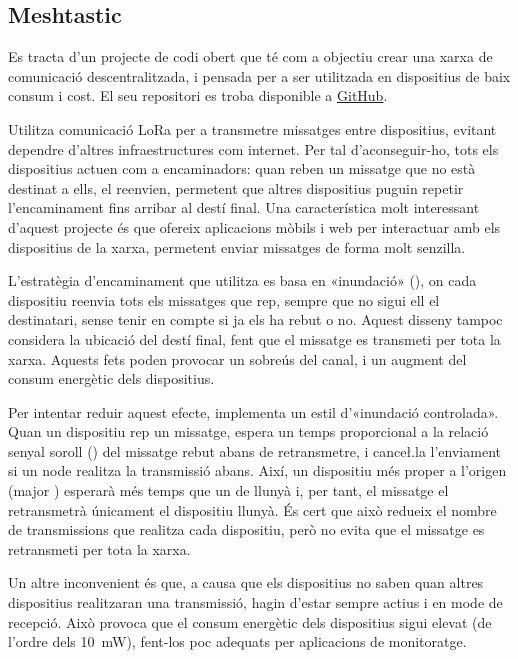 \documentclass{tfgitic}[2024/07/01]
\begin{document}
\subsection{Meshtastic}
Es tracta d'un projecte de codi obert que té com a objectiu crear una xarxa de comunicació descentralitzada, i pensada per a ser utilitzada en dispositius de baix consum i cost. El seu repositori es troba disponible a \href{https://github.com/meshtastic}{GitHub}.

Utilitza comunicació LoRa per a transmetre missatges entre dispositius, evitant dependre d'altres infraestructures com internet. Per tal d'aconseguir-ho, tots els dispositius actuen com a encaminadors: quan reben un missatge que no està destinat a ells, el reenvien, permetent que altres dispositius puguin repetir l'encaminament fins arribar al destí final. Una característica molt interessant d'aquest projecte és que ofereix aplicacions mòbils i web per interactuar amb els dispositius de la xarxa, permetent enviar missatges de forma molt senzilla.

L'estratègia d'encaminament que utilitza es basa en «inundació» (), on cada dispositiu reenvia tots els missatges que rep, sempre que no sigui ell el destinatari, sense tenir en compte si ja els ha rebut o no. Aquest disseny tampoc considera la ubicació del destí final, fent que el missatge es transmeti per tota la xarxa. Aquests fets poden provocar un sobreús del canal, i un augment del consum energètic dels dispositius. 

Per intentar reduir aquest efecte, implementa un estil d'«inundació controlada». Quan un dispositiu rep un missatge, espera un temps proporcional a la relació senyal soroll () del missatge rebut abans de retransmetre, i cance\l.la l'enviament si un node realitza la transmissió abans. Així, un dispositiu més proper a l'origen (major ) esperarà més temps que un de llunyà i, per tant, el missatge el retransmetrà únicament el dispositiu llunyà. És cert que això redueix el nombre de transmissions que realitza cada dispositiu, però no evita que el missatge es retransmeti per tota la xarxa. 

Un altre inconvenient és que, a causa que els dispositius no saben quan altres dispositius realitzaran una transmissió, hagin d'estar sempre actius i en mode de recepció. Això provoca que el consum energètic dels dispositius sigui elevat (de l'ordre dels \SI{10}{\milli\watt}), fent-los poc adequats per aplicacions de monitoratge.
\end{document}
